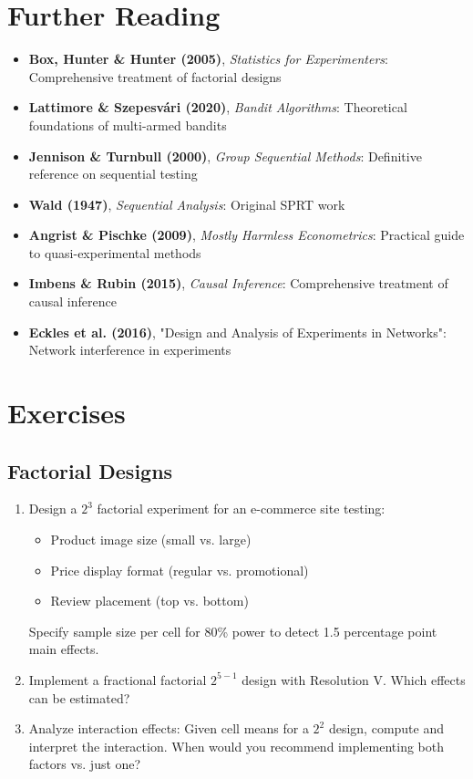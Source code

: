 \section{Further Reading}

\begin{itemize}
    \item \textbf{Box, Hunter \& Hunter (2005)}, \textit{Statistics for Experimenters}: Comprehensive treatment of factorial designs
    \item \textbf{Lattimore \& Szepesvári (2020)}, \textit{Bandit Algorithms}: Theoretical foundations of multi-armed bandits
    \item \textbf{Jennison \& Turnbull (2000)}, \textit{Group Sequential Methods}: Definitive reference on sequential testing
    \item \textbf{Wald (1947)}, \textit{Sequential Analysis}: Original SPRT work
    \item \textbf{Angrist \& Pischke (2009)}, \textit{Mostly Harmless Econometrics}: Practical guide to quasi-experimental methods
    \item \textbf{Imbens \& Rubin (2015)}, \textit{Causal Inference}: Comprehensive treatment of causal inference
    \item \textbf{Eckles et al. (2016)}, "Design and Analysis of Experiments in Networks": Network interference in experiments
\end{itemize}

\section{Exercises}

\subsection{Factorial Designs}

\begin{enumerate}
    \item Design a $2^3$ factorial experiment for an e-commerce site testing:
    \begin{itemize}
        \item Product image size (small vs. large)
        \item Price display format (regular vs. promotional)
        \item Review placement (top vs. bottom)
    \end{itemize}
    Specify sample size per cell for 80\% power to detect 1.5 percentage point main effects.

    \item Implement a fractional factorial $2^{5-1}$ design with Resolution V. Which effects can be estimated?

    \item Analyze interaction effects: Given cell means for a $2^2$ design, compute and interpret the interaction. When would you recommend implementing both factors vs. just one?
\end{enumerate}

